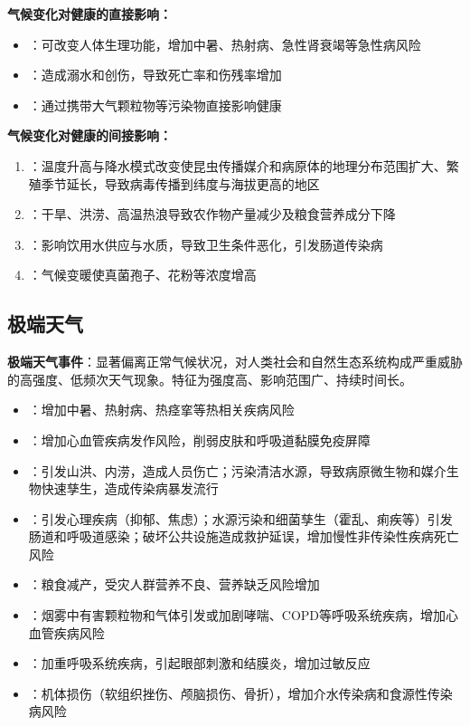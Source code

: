 \begin{keybox}
\textbf{气候变化对健康的直接影响：}
\begin{itemize}[leftmargin=*]
    \item {}：可改变人体生理功能，增加中暑、热射病、急性肾衰竭等急性病风险
    \item {}：造成溺水和创伤，导致死亡率和伤残率增加
    \item {}：通过携带大气颗粒物等污染物直接影响健康
\end{itemize}

\textbf{气候变化对健康的间接影响：}
\begin{enumerate}[leftmargin=*]
    \item {}：温度升高与降水模式改变使昆虫传播媒介和病原体的地理分布范围扩大、繁殖季节延长，导致病毒传播到纬度与海拔更高的地区
    \item {}：干旱、洪涝、高温热浪导致农作物产量减少及粮食营养成分下降
    \item {}：影响饮用水供应与水质，导致卫生条件恶化，引发肠道传染病
    \item {}：气候变暖使真菌孢子、花粉等浓度增高
\end{enumerate}
\end{keybox}

\subsection{极端天气}

\begin{defbox}
\textbf{极端天气事件}：显著偏离正常气候状况，对人类社会和自然生态系统构成严重威胁的高强度、低频次天气现象。特征为强度高、影响范围广、持续时间长。

\begin{itemize}[leftmargin=*]
    \item {}：增加中暑、热射病、热痉挛等热相关疾病风险
    \item {}：增加心血管疾病发作风险，削弱皮肤和呼吸道黏膜免疫屏障
    \item {}：引发山洪、内涝，造成人员伤亡；污染清洁水源，导致病原微生物和媒介生物快速孳生，造成传染病暴发流行
    \item {}：引发心理疾病（抑郁、焦虑）；水源污染和细菌孳生（霍乱、痢疾等）引发肠道和呼吸道感染；破坏公共设施造成救护延误，增加慢性非传染性疾病死亡风险
    \item {}：粮食减产，受灾人群营养不良、营养缺乏风险增加
    \item {}：烟雾中有害颗粒物和气体引发或加剧哮喘、COPD等呼吸系统疾病，增加心血管疾病风险
    \item {}：加重呼吸系统疾病，引起眼部刺激和结膜炎，增加过敏反应
    \item {}：机体损伤（软组织挫伤、颅脑损伤、骨折），增加介水传染病和食源性传染病风险
\end{itemize}
\end{defbox}


